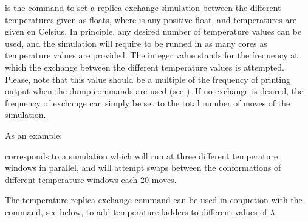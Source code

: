 \documentclass[letterpaper,10pt,english]{sphinxmanual}
\begin{document}
is the command to set a replica exchange simulation between the different temperatures given as floats, where  is any positive float, and temperatures are given en Celsius. In principle, any desired number of temperature values can be used, and the simulation will require to be runned in as many cores as temperature values are provided. The integer value stands for the frequency at which the exchange between the different temperature values is attempted. Please, note that this value should be a multiple of the frequency of printing output when the dump commands are used (see {\hyperref[\detokenize{protoms:frequent-output-generation}]{}}). If no exchange is desired, the frequency of exchange can simply be set to the total number of moves of the simulation.

As an example:

%
\begin{sphinxVerbatim}[commandchars=\\\{\}]
    
\end{sphinxVerbatim}

corresponds to a simulation which will run at three different temperature windows in parallel, and will attempt swaps between the conformations of different temperature windows each 20 moves.

The temperature replica-exchange command can be used in conjuction with the  command, see below, to add temperature ladders to different values of \(\lambda\).

\ignorespaces 
\def\sphinxLiteralBlockLabel{\label{\detokenize{protoms:index-45}}}
%
\begin{sphinxVerbatim}[commandchars=\\\{\}]
               
\end{sphinxVerbatim}
\end{document}
